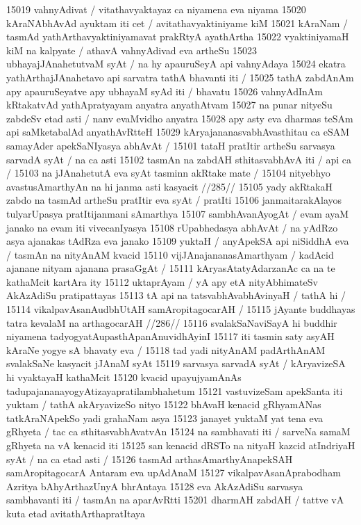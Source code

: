 15019 vahnyAdivat / vitathavyaktayaz ca niyamena eva niyama 
15020 kAraNAbhAvAd ayuktam iti cet / avitathavyaktiniyame kiM
15021 kAraNam / tasmAd yathArthavyaktiniyamavat prakRtyA ayathArtha 
15022 vyaktiniyamaH kiM na kalpyate / athavA vahnyAdivad eva artheSu 
15023 ubhayajJAnahetutvaM syAt / na hy apauruSeyA api vahnyAdaya
15024 ekatra yathArthajJAnahetavo api sarvatra tathA bhavanti iti /  
15025 tathA zabdAnAm apy apauruSeyatve apy ubhayaM syAd iti / bhavatu 
15026 vahnyAdInAm kRtakatvAd yathApratyayam anyatra anyathAtvam
15027 na punar nityeSu zabdeSv etad asti / nanv evaMvidho anyatra
15028 apy asty eva dharmas teSAm api saMketabalAd anyathAvRtteH
15029 kAryajananasvabhAvasthitau ca eSAM samayAder apekSaNIyasya abhAvAt /
15101 tataH pratItir artheSu sarvasya sarvadA syAt / na ca asti  
15102 tasmAn na zabdAH sthitasvabhAvA iti / api ca /  
15103 	na jJAnahetutA eva syAt tasminn akRtake mate / 
15104 	nityebhyo avastusAmarthyAn na hi janma asti kasyacit //285//
15105 yady akRtakaH zabdo na tasmAd artheSu pratItir eva syAt / pratIti 
15106 janmaitarakAlayos tulyarUpasya pratItijanmani sAmarthya 
15107 sambhAvanAyogAt / evam ayaM janako na evam iti vivecanIyasya  
15108 rUpabhedasya abhAvAt / na yAdRzo asya ajanakas tAdRza eva janako 
15109 yuktaH / anyApekSA api niSiddhA eva / tasmAn na nityAnAM kvacid 
15110 vijJAnajananasAmarthyam / kadAcid ajanane nityam ajanana prasaGgAt /
15111 kAryasAtatyAdarzanAc ca na te kathaMcit kartAra ity 
15112 uktaprAyam / yA apy etA nityAbhimateSv AkAzAdiSu pratipattayas 
15113 tA api na tatsvabhAvabhAvinyaH / tathA hi / 
15114 	vikalpavAsanAudbhUtAH samAropitagocarAH / 
15115 	jAyante buddhayas tatra kevalaM na arthagocarAH //286//  
15116 svalakSaNaviSayA hi buddhir niyamena tadyogyatAupasthApanAnuvidhAyinI
15117 iti tasmin saty asyAH kAraNe yogye sA bhavaty eva /  
15118 tad yadi nityAnAM padArthAnAM svalakSaNe kasyacit jJAnaM syAt
15119 sarvasya sarvadA syAt / kAryavizeSA hi vyaktayaH kathaMcit  
15120 kvacid upayujyamAnAs tadupajananayogyAtizayapratilambhahetum
15121 vastuvizeSam apekSanta iti yuktam / tathA akAryavizeSo nityo 
15122 bhAvaH kenacid gRhyamANas tatkAraNApekSo yadi grahaNam asya
15123 janayet yuktaM yat tena eva gRhyeta / tac ca sthitasvabhAvatvAn  
15124 na sambhavati iti / sarveNa samaM gRhyeta na vA kenacid iti  
15125 san kenacid dRSTo na nityaH kazcid atIndriyaH syAt / na ca etad asti /  
15126 tasmAd arthasAmarthyAnapekSAH samAropitagocarA Antaram eva upAdAnaM
15127 vikalpavAsanAprabodham Azritya bAhyArthazUnyA bhrAntaya 
15128 eva AkAzAdiSu sarvasya sambhavanti iti / tasmAn na aparAvRtti  
15201 dharmAH zabdAH / tattve vA kuta etad avitathArthapratItaya
